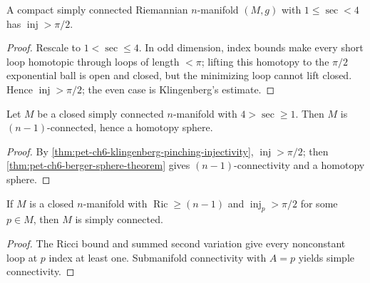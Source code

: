 \begin{theorem}
  \label{thm:pet-ch6-klingenberg-pinching-injectivity}
  A compact simply connected Riemannian $n$-manifold $(M,g)$ with
  $1\le\sec<4$ has $\operatorname{inj}>\pi/2$.
\end{theorem}
\begin{proof}
  \sketch
  Rescale to \(1<\sec\le4\). In odd dimension, index bounds make every short loop homotopic through loops of length \(<\pi\); lifting this homotopy to the \(\pi/2\) exponential ball is open and closed, but the minimizing loop cannot lift closed. Hence \(\operatorname{inj}>\pi/2\); the even case is Klingenberg's estimate.
\end{proof}

\begin{corollary}
  \label{cor:pet-ch6-rauch-berger-klingenberg-sphere}
  Let $M$ be a closed simply connected $n$-manifold with $4>\sec\ge1$. Then
  $M$ is $(n-1)$-connected, hence a homotopy sphere.
\end{corollary}
\begin{proof}
  \sketch
  By \cref{thm:pet-ch6-klingenberg-pinching-injectivity}, \(\operatorname{inj}>\pi/2\); then \cref{thm:pet-ch6-berger-sphere-theorem} gives \((n-1)\)-connectivity and a homotopy sphere.
\end{proof}

\begin{corollary}
  \label{cor:pet-ch6-ricci-simply-connected}
  If $M$ is a closed $n$-manifold with $\operatorname{Ric}\ge(n-1)$ and $\operatorname{inj}_p>\pi/2$
  for some $p\in M$, then $M$ is simply connected.
\end{corollary}
\begin{proof}
  \sketch
  The Ricci bound and summed second variation give every nonconstant loop at \(p\) index at least one. Submanifold connectivity with \(A={p}\) yields simple connectivity.
\end{proof}

